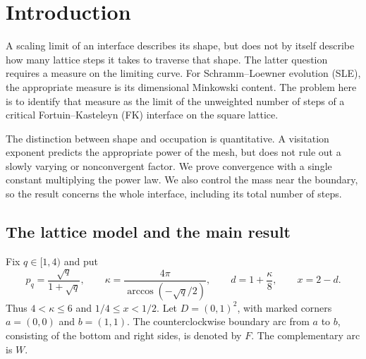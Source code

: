 \begin{abstract}
We prove that the rescaled counting measure of a critical square-lattice
Fortuin--Kasteleyn Dobrushin interface in the unit square converges to the
Minkowski-content measure of its Schramm--Loewner limit, for every fixed
cluster weight $1\le q<4$. A single deterministic constant times the
predicted power of the mesh gives the normalization. Convergence is joint
with the ordered curve and includes the total mass, giving the scaling
limit of the interface's total number of steps.
\end{abstract}

\section{Introduction}\label{sec:introduction}

A scaling limit of an interface describes its shape, but does not by
itself describe how many lattice steps it takes to traverse that shape.
The latter question requires a measure on the limiting curve. For
Schramm--Loewner evolution (SLE), the appropriate measure is its
dimensional Minkowski content. The problem here is to identify that
measure as the limit of the unweighted number of steps of a critical
Fortuin--Kasteleyn (FK) interface on the square lattice.

The distinction between shape and occupation is quantitative. A
visitation exponent predicts the appropriate power of the mesh, but
does not rule out a slowly varying or nonconvergent factor. We prove
convergence with a single constant multiplying the power law. We also
control the mass near the boundary, so the result concerns the whole
interface, including its total number of steps.

\subsection{The lattice model and the main result}

Fix $q\in[1,4)$ and put
\begin{equation}\label{eq:parameters}
 p_q=\frac{\sqrt q}{1+\sqrt q},\qquad
 \kappa=\frac{4\pi}{\arccos(-\sqrt q/2)},\qquad
 d=1+\frac{\kappa}{8},\qquad x=2-d.
\end{equation}
Thus $4<\kappa\le6$ and $1/4\le x<1/2$.
Let $D=(0,1)^2$, with marked corners $a=(0,0)$ and $b=(1,1)$.
The counterclockwise boundary arc from $a$ to $b$, consisting of the
bottom and right sides, is denoted by $F$. The complementary arc is $W$.

